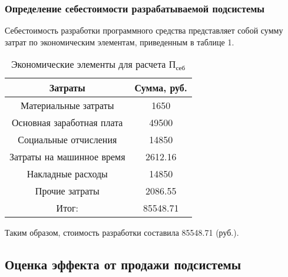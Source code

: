 \documentclass[a4paper]{extarticle}
\begin{document}
\subsubsection{Определение себестоимости разрабатываемой подсистемы}
Себестоимость разработки программного средства представляет собой сумму затрат по экономическим элементам, приведенным в таблице 1.\par
\begin{table}[H]
\caption{Экономические элементы для расчета $\text{П}_\text{себ}$}
\centering
  \begin{tabular}{|c|c|}
  \hline
  Затраты & Сумма, руб. \\\hline
  Материальные затраты & 1650 \\\hline
  Основная заработная плата & 49500 \\\hline
  Социальные отчисления & 14850 \\\hline
  Затраты на машинное время & 2612.16 \\\hline
  Накладные расходы & 14850 \\\hline
  Прочие затраты & 2086.55 \\\hline
  Итог: & 85548.71 \\
  \hline
  \end{tabular}
\end{table}\par
Таким образом, стоимость разработки составила 85548.71 (руб.).\par

\subsection{Оценка эффекта от продажи подсистемы}
\end{document}
